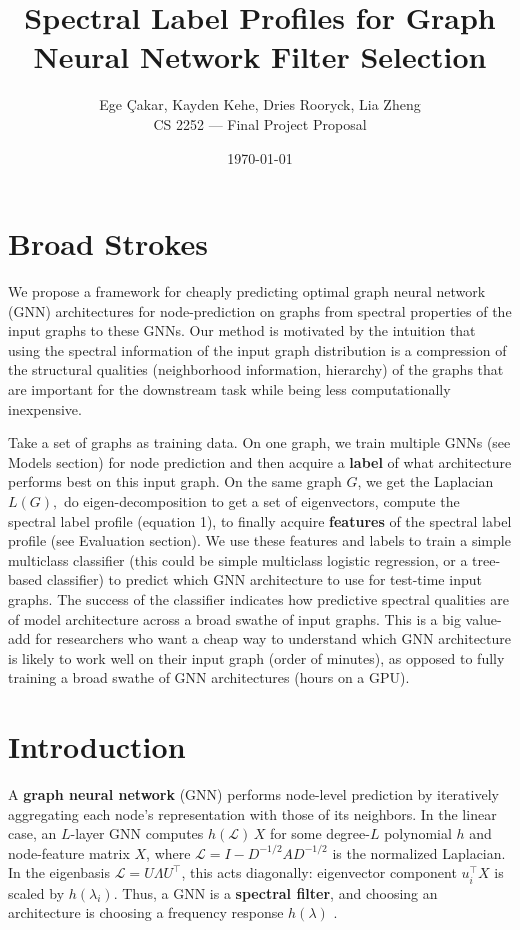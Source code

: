 \documentclass[11pt]{article}
\title{Spectral Label Profiles for Graph Neural Network Filter Selection}
\author{Ege \c{C}akar, Kayden Kehe, Dries Rooryck, Lia Zheng \\ CS 2252 --- Final Project Proposal}
\date{\today}
\newcommand{\Lap}{\mathcal{L}}
\begin{document}
\maketitle

\section{Broad Strokes}
We propose a framework for cheaply predicting optimal graph neural network (GNN) architectures for node-prediction on graphs from spectral properties of the input graphs to these GNNs. Our method is motivated by the intuition that using the spectral information of the input graph distribution is a compression of the structural qualities (neighborhood information, hierarchy) of the graphs that are important for the downstream task while being less computationally inexpensive.

Take a set of graphs as training data. On one graph, we train multiple GNNs (see Models section) for node prediction and then acquire a \textbf{label} of what architecture performs best on this input graph. On the same graph $G$, we get the Laplacian $L(G),$ do eigen-decomposition to get a set of eigenvectors, compute the spectral label profile (equation 1), to finally acquire \textbf{features} of the spectral label profile (see Evaluation section). We use these features and labels to train a simple multiclass classifier (this could be simple multiclass logistic regression, or a tree-based classifier) to predict which GNN architecture to use for test-time input graphs. The success of the classifier indicates how predictive spectral qualities are of model architecture across a broad swathe of input graphs. This is a big value-add for researchers who want a cheap way to understand which GNN architecture is likely to work well on their input graph (order of minutes), as opposed to fully training a broad swathe of GNN architectures (hours on a GPU).

\section{Introduction}

A \textbf{graph neural network} (GNN) performs node-level prediction by iteratively aggregating each node's representation with those of its neighbors. In the linear case, an $L$-layer GNN computes $h(\Lap)\,X$ for some degree-$L$ polynomial $h$ and node-feature matrix $X$, where $\Lap = I - D^{-1/2}AD^{-1/2}$ is the normalized Laplacian. In the eigenbasis $\Lap = U\Lambda U^\top$, this acts diagonally: eigenvector component $u_i^\top X$ is scaled by $h(\lambda_i)$. Thus, a GNN is a \textbf{spectral filter}, and choosing an architecture is choosing a frequency response $h(\lambda)$ \citep{nt2019lowpass}.
\end{document}
